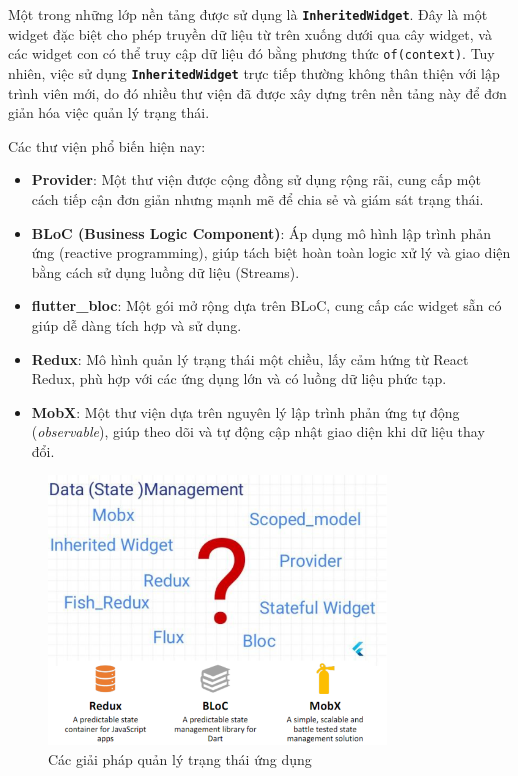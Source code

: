 \documentclass[../DoAn.tex]{subfiles}
\numberwithin{figure}{chapter}
\begin{document}
Một trong những lớp nền tảng được sử dụng là \textbf{\texttt{InheritedWidget}}. Đây là một widget đặc biệt cho phép truyền dữ liệu từ trên xuống dưới qua cây widget, và các widget con có thể truy cập dữ liệu đó bằng phương thức \texttt{of(context)}. Tuy nhiên, việc sử dụng \textbf{\texttt{InheritedWidget}} trực tiếp thường không thân thiện với lập trình viên mới, do đó nhiều thư viện đã được xây dựng trên nền tảng này để đơn giản hóa việc quản lý trạng thái.

Các thư viện phổ biến hiện nay:

\begin{itemize}
    \item \textbf{Provider}: Một thư viện được cộng đồng sử dụng rộng rãi, cung cấp một cách tiếp cận đơn giản nhưng mạnh mẽ để chia sẻ và giám sát trạng thái.
    \item \textbf{BLoC (Business Logic Component)}: Áp dụng mô hình lập trình phản ứng (reactive programming), giúp tách biệt hoàn toàn logic xử lý và giao diện bằng cách sử dụng luồng dữ liệu (Streams).
    \item \textbf{flutter\_bloc}: Một gói mở rộng dựa trên BLoC, cung cấp các widget sẵn có giúp dễ dàng tích hợp và sử dụng.
    \item \textbf{Redux}: Mô hình quản lý trạng thái một chiều, lấy cảm hứng từ React Redux, phù hợp với các ứng dụng lớn và có luồng dữ liệu phức tạp.
    \item \textbf{MobX}: Một thư viện dựa trên nguyên lý lập trình phản ứng tự động (\textit{observable}), giúp theo dõi và tự động cập nhật giao diện khi dữ liệu thay đổi.
\end{itemize}

\begin{figure}[H]
    \centering
    \includegraphics[width=0.8\textwidth]{Hinhve/Chuong5/statemanagement.png}
    \caption{Các giải pháp quản lý trạng thái ứng dụng}
    \label{fig:statemanagement}
\end{figure}
\end{document}
